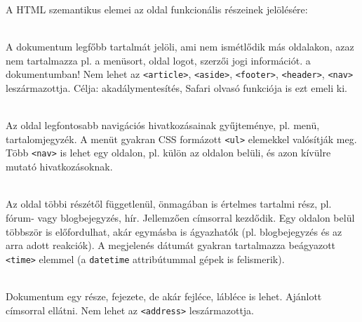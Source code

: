 \begin{frame}
  A HTML szemantikus elemei az oldal funkcionális részeinek jelölésére:
  \begin{description}[m]
    \item[\texttt{<main>}] \hfill \\ A dokumentum legfőbb tartalmát jelöli, ami nem ismétlődik más oldalakon, azaz nem tartalmazza pl. a menüsort, oldal logot, szerzői jogi információt.  a dokumentumban! Nem lehet az \texttt{<article>}, \texttt{<aside>}, \texttt{<footer>}, \texttt{<header>}, \texttt{<nav>} leszármazottja. Célja: akadálymentesítés, Safari olvasó funkciója is ezt emeli ki.
    \item[\texttt{<nav>}] \hfill \\ Az oldal legfontosabb navigációs hivatkozásainak gyűjteménye, pl. menü, tartalomjegyzék. A menüt gyakran CSS formázott \texttt{<ul>} elemekkel valósítják meg. Több \texttt{<nav>} is lehet egy oldalon, pl. külön az oldalon belüli, és azon kívülre mutató hivatkozásoknak.
  \end{description} 
\end{frame}

\begin{frame}
  \begin{description}[m]
    \item[\texttt{<article>}] \hfill \\ Az oldal többi részétől függetlenül, önmagában is értelmes tartalmi rész, pl. fórum- vagy blogbejegyzés, hír. Jellemzően címsorral kezdődik. Egy oldalon belül többször is előfordulhat, akár egymásba is ágyazhatók (pl. blogbejegyzés és az arra adott reakciók). A megjelenés dátumát gyakran tartalmazza beágyazott \texttt{<time>} elemmel (a \texttt{datetime} attribútummal gépek is felismerik).
    \item[\texttt{<section>}] \hfill \\ Dokumentum egy része, fejezete, de akár fejléce, lábléce is lehet. Ajánlott címsorral ellátni. Nem lehet az \texttt{<address>} leszármazottja.
  \end{description} 
\end{frame}

